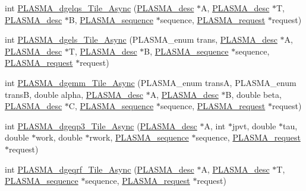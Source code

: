 \begin{DoxyCompactItemize}
\item 
int \hyperlink{group__double__Tile__Async_ga93723cad14758f4ad5f938e9be358cfa_ga93723cad14758f4ad5f938e9be358cfa}{P\+L\+A\+S\+M\+A\+\_\+dgelqs\+\_\+\+Tile\+\_\+\+Async} (\hyperlink{structplasma__desc__t}{P\+L\+A\+S\+M\+A\+\_\+desc} $\ast$A, \hyperlink{structplasma__desc__t}{P\+L\+A\+S\+M\+A\+\_\+desc} $\ast$T, \hyperlink{structplasma__desc__t}{P\+L\+A\+S\+M\+A\+\_\+desc} $\ast$B, \hyperlink{structplasma__sequence__t}{P\+L\+A\+S\+M\+A\+\_\+sequence} $\ast$sequence, \hyperlink{structplasma__request__t}{P\+L\+A\+S\+M\+A\+\_\+request} $\ast$request)
\item 
int \hyperlink{group__double__Tile__Async_gad059b24219da47df1bdf0ce686937ee2_gad059b24219da47df1bdf0ce686937ee2}{P\+L\+A\+S\+M\+A\+\_\+dgels\+\_\+\+Tile\+\_\+\+Async} (P\+L\+A\+S\+M\+A\+\_\+enum trans, \hyperlink{structplasma__desc__t}{P\+L\+A\+S\+M\+A\+\_\+desc} $\ast$A, \hyperlink{structplasma__desc__t}{P\+L\+A\+S\+M\+A\+\_\+desc} $\ast$T, \hyperlink{structplasma__desc__t}{P\+L\+A\+S\+M\+A\+\_\+desc} $\ast$B, \hyperlink{structplasma__sequence__t}{P\+L\+A\+S\+M\+A\+\_\+sequence} $\ast$sequence, \hyperlink{structplasma__request__t}{P\+L\+A\+S\+M\+A\+\_\+request} $\ast$request)
\item 
int \hyperlink{group__double__Tile__Async_ga6593acd51a2ba2910cfae916ca3cb0d3_ga6593acd51a2ba2910cfae916ca3cb0d3}{P\+L\+A\+S\+M\+A\+\_\+dgemm\+\_\+\+Tile\+\_\+\+Async} (P\+L\+A\+S\+M\+A\+\_\+enum trans\+A, P\+L\+A\+S\+M\+A\+\_\+enum trans\+B, double alpha, \hyperlink{structplasma__desc__t}{P\+L\+A\+S\+M\+A\+\_\+desc} $\ast$A, \hyperlink{structplasma__desc__t}{P\+L\+A\+S\+M\+A\+\_\+desc} $\ast$B, double beta, \hyperlink{structplasma__desc__t}{P\+L\+A\+S\+M\+A\+\_\+desc} $\ast$C, \hyperlink{structplasma__sequence__t}{P\+L\+A\+S\+M\+A\+\_\+sequence} $\ast$sequence, \hyperlink{structplasma__request__t}{P\+L\+A\+S\+M\+A\+\_\+request} $\ast$request)
\item 
int \hyperlink{group__double__Tile__Async_ga36781fe53d01de2c68afa31001bed920_ga36781fe53d01de2c68afa31001bed920}{P\+L\+A\+S\+M\+A\+\_\+dgeqp3\+\_\+\+Tile\+\_\+\+Async} (\hyperlink{structplasma__desc__t}{P\+L\+A\+S\+M\+A\+\_\+desc} $\ast$A, int $\ast$jpvt, double $\ast$tau, double $\ast$work, double $\ast$rwork, \hyperlink{structplasma__sequence__t}{P\+L\+A\+S\+M\+A\+\_\+sequence} $\ast$sequence, \hyperlink{structplasma__request__t}{P\+L\+A\+S\+M\+A\+\_\+request} $\ast$request)
\item 
int \hyperlink{group__double__Tile__Async_ga72192914fae7434896e432c0afac1b7e_ga72192914fae7434896e432c0afac1b7e}{P\+L\+A\+S\+M\+A\+\_\+dgeqrf\+\_\+\+Tile\+\_\+\+Async} (\hyperlink{structplasma__desc__t}{P\+L\+A\+S\+M\+A\+\_\+desc} $\ast$A, \hyperlink{structplasma__desc__t}{P\+L\+A\+S\+M\+A\+\_\+desc} $\ast$T, \hyperlink{structplasma__sequence__t}{P\+L\+A\+S\+M\+A\+\_\+sequence} $\ast$sequence, \hyperlink{structplasma__request__t}{P\+L\+A\+S\+M\+A\+\_\+request} $\ast$request)

\end{DoxyCompactItemize}
